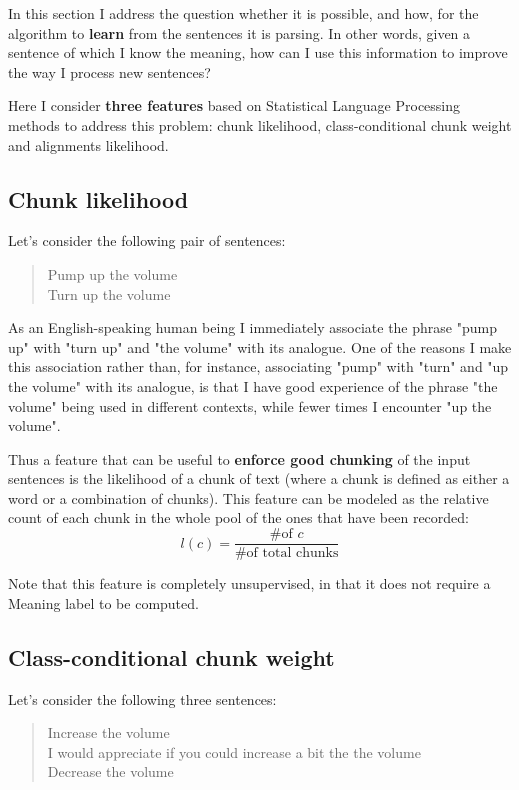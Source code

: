 In this section I address the question whether it is possible, and how, for the algorithm to \textbf{learn} from the sentences it is parsing. In other words, given a sentence of which I know the meaning, how can I use this information to improve the way I process new sentences?

Here I consider \textbf{three features} based on Statistical Language Processing methods to address this problem: chunk likelihood, class-conditional chunk weight and alignments likelihood.

\subsection{Chunk likelihood} \label{ch3:ml:cl}
Let's consider the following pair of sentences:
\begin{quote}
Pump up the volume\\
Turn up the volume
\end{quote}

As an English-speaking human being I immediately associate the phrase "pump up" with "turn up" and "the volume" with its analogue. One of the reasons I make this association rather than, for instance, associating "pump" with "turn" and "up the volume" with its analogue, is that I have good experience of the phrase "the volume" being used in different contexts, while fewer times I encounter "up the volume".

Thus a feature that can be useful to \textbf{enforce good chunking} of the input sentences is the likelihood of a chunk of text (where a chunk is defined as either a word or a combination of chunks). This feature can be modeled as the relative count of each chunk in the whole pool of the ones that have been recorded:
$$
l(c)=\frac{\text{\# of }c}{\text{\# of total chunks}}
$$

Note that this feature is completely unsupervised, in that it does not require a Meaning label to be computed.
\subsection{Class-conditional chunk weight} \label{ch3:ml:cc}
Let's consider the following three sentences:
\begin{quote}
Increase the volume\\
I would appreciate if you could increase a bit the the volume\\
Decrease the volume
\end{quote}


